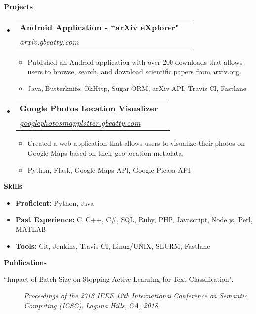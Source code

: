 \documentclass[letterpaper,11pt]{article}
\makeatletter
\newcommand{\resitem}[1]{\item #1 \vspace{-2pt}}
\newcommand{\resheading}[1]{{\large \colorbox{mygrey}{\begin{minipage}{\textwidth}{\textbf{#1 \vphantom{p\^{E}}}}\end{minipage}}}}
\newcommand{\ressubheading}[4]{
\begin{tabular*}{7.0in}{l@{\extracolsep{\fill}}r}
		\textbf{#1} & #2 \\
		\textit{#3} & \textit{#4} \\
\end{tabular*}\vspace{-6pt}}
\makeatother
\begin{document}
\resheading{Projects}
\begin{itemize}
\item
	\ressubheading{Android Application - ``arXiv eXplorer"}{}{\href{http://arxiv.gbeatty.com}{arxiv.gbeatty.com}}{}
	\begin{itemize}
		\resitem{Published an Android application with over 200 downloads that allows users to browse, search, and download scientific papers from \href{http://arxiv.org}{arxiv.org}.}
		\resitem{Java, Butterknife, OkHttp, Sugar ORM, arXiv API, Travis CI, Fastlane}
	\end{itemize}

\item
	\ressubheading{Google Photos Location Visualizer}{}{\href{http://googlephotosmapplotter.gbeatty.com}{googlephotosmapplotter.gbeatty.com}}{}
	\begin{itemize}
		\resitem{Created a web application that allows users to visualize their photos on Google Maps based on their geo-location metadata.}
		\resitem{Python, Flask, Google Maps API, Google Picasa API}
	\end{itemize}

\end{itemize}

\resheading{Skills}
	\begin{itemize}
	\resitem{\textbf{Proficient:} Python, Java}
	\resitem{\textbf{Past Experience:} C, C++, C\#, SQL, Ruby, PHP, Javascript, Node.js, Perl, MATLAB}
	\resitem{\textbf{Tools:} Git, Jenkins, Travis CI, Linux/UNIX, SLURM, Fastlane}
	\end{itemize}

\resheading{Publications}
\begin{description}
\item[``Impact of Batch Size on Stopping Active Learning for Text Classification",]
\emph{Proceedings of the 2018 IEEE 12th International Conference on Semantic Computing (ICSC), Laguna Hills, CA, 2018.}
\end{description}
\end{document}
